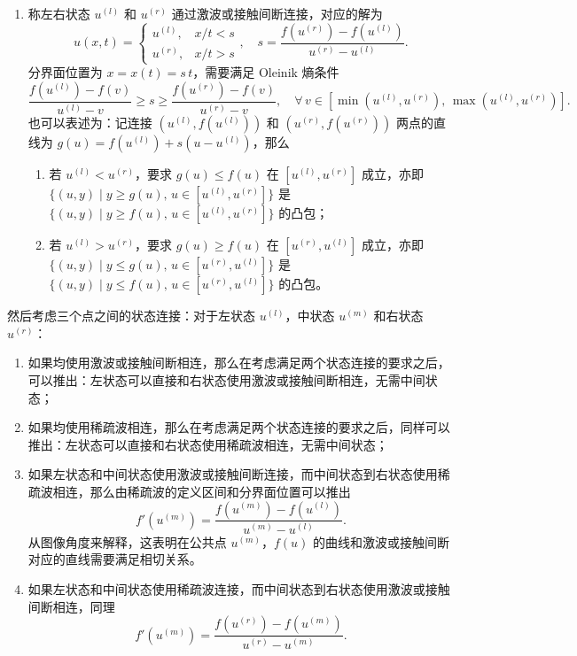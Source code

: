 \begin{enumerate}
    \item 称左右状态 $u^{(l)}$ 和 $u^{(r)}$ 通过激波或接触间断连接，对应的解为
          \[
              u(x,t) =
              \begin{cases}
                  u^{(l)}, & x/t < s \\
                  u^{(r)}, & x/t > s
              \end{cases}, \quad s = \frac{f(u^{(r)})-f(u^{(l)})}{u^{(r)} - u^{(l)}}.
          \]
          分界面位置为 $x = x(t) = s\,t$，需要满足 Oleinik 熵条件
          \[
              \frac{f(u^{(l)})-f(v)}{u^{(l)}-v} \ge s \ge \frac{f(u^{(r)})-f(v)}{u^{(r)}-v},
              \quad \forall\,v \in [\min(u^{(l)}, u^{(r)}),\,\max(u^{(l)}, u^{(r)})].
          \]
          也可以表述为：记连接 $(u^{(l)},f(u^{(l)}))$ 和 $(u^{(r)},f(u^{(r)}))$ 两点的直线为 $g(u) = f(u^{(l)}) + s(u - u^{(l)})$，那么
          \begin{enumerate}
              \item 若 $u^{(l)} < u^{(r)}$，要求 $g(u) \le f(u)$ 在 $[u^{(l)},u^{(r)}]$ 成立，亦即 $\{ (u,y) \mid y \ge g(u),\, u \in [u^{(l)},u^{(r)}]\}$ 是 $\{ (u,y) \mid y \ge f(u),\, u \in [u^{(l)},u^{(r)}]\}$ 的凸包；
              \item 若 $u^{(l)} > u^{(r)}$，要求 $g(u) \ge f(u)$ 在 $[u^{(r)},u^{(l)}]$ 成立，亦即 $\{ (u,y) \mid y \le g(u),\, u \in [u^{(r)},u^{(l)}]\}$ 是 $\{ (u,y) \mid y \le f(u),\, u \in [u^{(r)},u^{(l)}]\}$ 的凸包。
          \end{enumerate}
\end{enumerate}
然后考虑三个点之间的状态连接：对于左状态 $u^{(l)}$，中状态 $u^{(m)}$ 和右状态 $u^{(r)}$：
\begin{enumerate}
    \item 如果均使用激波或接触间断相连，那么在考虑满足两个状态连接的要求之后，可以推出：左状态可以直接和右状态使用激波或接触间断相连，无需中间状态；
    \item 如果均使用稀疏波相连，那么在考虑满足两个状态连接的要求之后，同样可以推出：左状态可以直接和右状态使用稀疏波相连，无需中间状态；
    \item 如果左状态和中间状态使用激波或接触间断连接，而中间状态到右状态使用稀疏波相连，那么由稀疏波的定义区间和分界面位置可以推出
          \[
              f'(u^{(m)}) = \frac{f(u^{(m)}) - f(u^{(l)})}{u^{(m)} - u^{(l)}}.
          \]
          从图像角度来解释，这表明在公共点 $u^{(m)}$，$f(u)$ 的曲线和激波或接触间断对应的直线需要满足相切关系。
    \item 如果左状态和中间状态使用稀疏波连接，而中间状态到右状态使用激波或接触间断相连，同理
          \[
              f'(u^{(m)}) = \frac{f(u^{(r)}) - f(u^{(m)})}{u^{(r)} - u^{(m)}}.
          \]
\end{enumerate}

